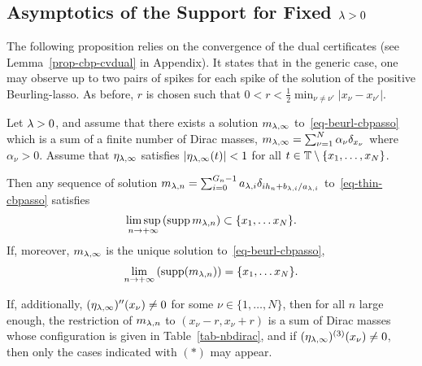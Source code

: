 \subsection{Asymptotics of the Support for Fixed $\lambda>0$}


The following proposition relies on the convergence of the dual certificates (see Lemma~\ref{prop-cbp-cvdual} in Appendix). It states that in the generic case, one may observe up to two pairs of spikes for each spike of the solution of the positive Beurling-lasso. 
%
As before, $r$ is chosen such that $0<r<\frac{1}{2} \min_{\nu\neq\nu'}|x_{\nu}-x_{\nu'}|$.

\begin{prop}\label{prop-cbp-thin-supplambda}
  Let $\lambda >0$, and assume that there exists a solution $m_{\lambda,\infty}$ to~\eqref{eq-beurl-cbpasso} which is a sum of a finite number of Dirac masses, $m_{\lambda,\infty}= \sum_{\nu=1}^N \alpha_\nu \delta_{x_\nu}$ where $\alpha_\nu> 0$. Assume that $\eta_{\lambda,\infty}$ satisfies $| \eta_{\lambda,\infty}(t) |<1$ for all $t\in \mathbb{T}\setminus \{x_1,\ldots ,x_N \}$. 
  
  Then any sequence of solution $m_{\lambda,n}=\sum_{i=0}^{{G_n}-1} a_{\lambda,i} \delta_{i{h_n}+b_{\lambda,i}/a_{\lambda,i} }$ to~\eqref{eq-thin-cbpasso} satisfies 
  \begin{align*}
    \limsup_{n\to+\infty}\left(\operatorname{supp} m_{\lambda,n}\right)\subset \{x_1, \ldots x_N\}.
  \end{align*}
  If, moreover, $m_{\lambda,\infty}$ is the unique solution to~\eqref{eq-beurl-cbpasso}, 
  \begin{align}
    \lim_{n\to+\infty}\left(\operatorname{supp} (m_{\lambda,n})\right)= \{x_1, \ldots x_N\}.
  \end{align}

  If, additionally, $(\eta_{\lambda,\infty})''(x_\nu)\neq 0$ for some $\nu \in\{1,\ldots,N\}$, then for all $n$ large enough, the restriction of $m_{\lambda,n}$ to $(x_\nu-r,x_\nu+r)$ is a sum of Dirac masses whose configuration is given in Table~\ref{tab-nbdirac}, and if $(\eta_{\lambda,\infty})^{(3)}(x_\nu)\neq 0$, then only the cases indicated with $(\ast)$ may appear. 
\end{prop}

